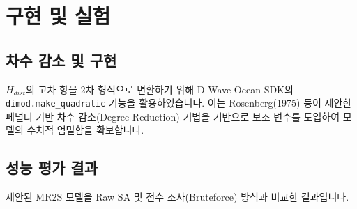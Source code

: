 \documentclass[11pt,a4paper]{article}
\begin{document}
\section{구현 및 실험}

\subsection{차수 감소 및 구현}
$H_{dist}$의 고차 항을 2차 형식으로 변환하기 위해 D-Wave Ocean SDK의 \texttt{dimod.\allowbreak make\_quadratic} 기능을 활용하였습니다. 이는 Rosenberg(1975) 등이 제안한 페널티 기반 차수 감소(Degree Reduction) 기법을 기반으로 보조 변수를 도입하여 모델의 수치적 엄밀함을 확보합니다.\cite{glover2018tutorial}

\subsection{성능 평가 결과}
제안된 MR2S 모델을 Raw SA 및 전수 조사(Bruteforce) 방식과 비교한 결과입니다.
\end{document}
